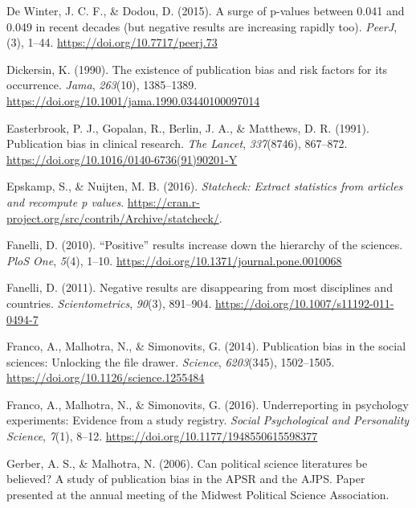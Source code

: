 \documentclass[
  12pt,
]{article}
\begin{document}
\leavevmode\hypertarget{ref-DeWinter}{}%
De Winter, J. C. F., \& Dodou, D. (2015). A surge of p-values between
0.041 and 0.049 in recent decades (but negative results are increasing
rapidly too). \emph{PeerJ}, (3), 1--44.
\url{https://doi.org/10.7717/peerj.73}

\leavevmode\hypertarget{ref-Dickersin}{}%
Dickersin, K. (1990). The existence of publication bias and risk factors
for its occurrence. \emph{Jama}, \emph{263}(10), 1385--1389.
\url{https://doi.org/10.1001/jama.1990.03440100097014}

\leavevmode\hypertarget{ref-Easterbrook}{}%
Easterbrook, P. J., Gopalan, R., Berlin, J. A., \& Matthews, D. R.
(1991). Publication bias in clinical research. \emph{The Lancet},
\emph{337}(8746), 867--872.
\url{https://doi.org/10.1016/0140-6736(91)90201-Y}

\leavevmode\hypertarget{ref-statcheck122}{}%
Epskamp, S., \& Nuijten, M. B. (2016). \emph{Statcheck: Extract
statistics from articles and recompute p values}.
\url{https://cran.r-project.org/src/contrib/Archive/statcheck/}.

\leavevmode\hypertarget{ref-Fanelli2010}{}%
Fanelli, D. (2010). ``Positive'' results increase down the hierarchy of
the sciences. \emph{PloS One}, \emph{5}(4), 1--10.
\url{https://doi.org/10.1371/journal.pone.0010068}

\leavevmode\hypertarget{ref-Fanelli2011}{}%
Fanelli, D. (2011). Negative results are disappearing from most
disciplines and countries. \emph{Scientometrics}, \emph{90}(3),
891--904. \url{https://doi.org/10.1007/s11192-011-0494-7}

\leavevmode\hypertarget{ref-Franco2014}{}%
Franco, A., Malhotra, N., \& Simonovits, G. (2014). Publication bias in
the social sciences: Unlocking the file drawer. \emph{Science},
\emph{6203}(345), 1502--1505.
\url{https://doi.org/10.1126/science.1255484}

\leavevmode\hypertarget{ref-Franco2016}{}%
Franco, A., Malhotra, N., \& Simonovits, G. (2016). Underreporting in
psychology experiments: Evidence from a study registry. \emph{Social
Psychological and Personality Science}, \emph{7}(1), 8--12.
\url{https://doi.org/10.1177/1948550615598377}

\leavevmode\hypertarget{ref-Gerber2006}{}%
Gerber, A. S., \& Malhotra, N. (2006). Can political science literatures
be believed? A study of publication bias in the APSR and the AJPS. Paper
presented at the annual meeting of the Midwest Political Science
Association.
\end{document}
